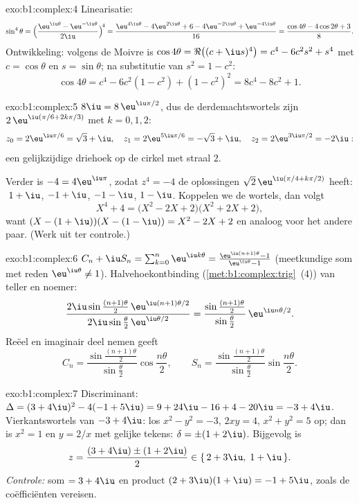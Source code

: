 \begin{solution}{exo:b1:complex:4}
Linearisatie:
\[
\sin^4\theta
= \Bigl(\frac{\eu^{\iu\theta} - \eu^{-\iu\theta}}{2\iu}\Bigr)^{\!4}
= \frac{\eu^{4\iu\theta} - 4\eu^{2\iu\theta} + 6 - 4\eu^{-2\iu\theta}
+ \eu^{-4\iu\theta}}{16}
= \frac{\cos 4\theta - 4\cos 2\theta + 3}{8}.
\]
Ontwikkeling: volgens de Moivre is $\cos 4\theta = \Re\bigl((c + \iu
s)^4\bigr) = c^4 - 6c^2 s^2 + s^4$ met $c = \cos\theta$ en $s =
\sin\theta$; na substitutie van $s^2 = 1 - c^2$:
\[
\cos 4\theta = c^4 - 6c^2(1 - c^2) + (1 - c^2)^2
= 8c^4 - 8c^2 + 1 .
\]
\end{solution}

\begin{solution}{exo:b1:complex:5}
$8\iu = 8\,\eu^{\iu\pi/2}$, dus de derdemachtswortels zijn
$2\,\eu^{\iu(\pi/6 + 2k\pi/3)}$ met $k = 0, 1, 2$:
\[
z_0 = 2\eu^{\iu\pi/6} = \sqrt 3 + \iu,\quad
z_1 = 2\eu^{5\iu\pi/6} = -\sqrt 3 + \iu,\quad
z_2 = 2\eu^{3\iu\pi/2} = -2\iu :
\]
een gelijkzijdige driehoek op de cirkel met straal $2$.

Verder is $-4 = 4\eu^{\iu\pi}$, zodat $z^4 = -4$ de oplossingen $\sqrt
2\, \eu^{\iu(\pi/4 + k\pi/2)}$ heeft: $\;1 + \iu$, $-1 + \iu$, $-1 -
\iu$, $1 - \iu$. Koppelen we de  wortels, dan volgt
\[
X^4 + 4 = \bigl(X^2 - 2X + 2\bigr)\bigl(X^2 + 2X + 2\bigr),
\]
want $(X - (1+\iu))(X - (1-\iu)) = X^2 - 2X + 2$ en analoog voor het
andere paar. (Werk uit ter controle.)
\end{solution}

\begin{solution}{exo:b1:complex:6}
$C_n + \iu S_n = \sum_{k=0}^{n} \eu^{\iu k\theta} =
\frac{\eu^{\iu(n+1)\theta} - 1}{\eu^{\iu\theta} - 1}$ (meetkundige som
met reden $\eu^{\iu\theta} \neq 1$). Halvehoekontbinding
(\cref{met:b1:complex:trig}~(4)) van teller en noemer:
\[
\frac{2\iu\sin\frac{(n+1)\theta}{2}\, \eu^{\iu(n+1)\theta/2}}
{2\iu\sin\frac{\theta}{2}\, \eu^{\iu\theta/2}}
= \frac{\sin\frac{(n+1)\theta}{2}}{\sin\frac{\theta}{2}}\,
\eu^{\iu n\theta/2}.
\]
Reëel en imaginair deel nemen geeft
\[
C_n = \frac{\sin\frac{(n+1)\theta}{2}}{\sin\frac{\theta}{2}}
\cos\frac{n\theta}{2},
\qquad
S_n = \frac{\sin\frac{(n+1)\theta}{2}}{\sin\frac{\theta}{2}}
\sin\frac{n\theta}{2}.
\]
\end{solution}

\begin{solution}{exo:b1:complex:7}
Discriminant: $\Delta = (3 + 4\iu)^2 - 4(-1 + 5\iu) = 9 + 24\iu - 16 + 4
- 20\iu = -3 + 4\iu$. Vierkantswortels van $-3 + 4\iu$: los $x^2 - y^2 =
-3$, $2xy = 4$, $x^2 + y^2 = 5$ op; dan is $x^2 = 1$ en $y = 2/x$ met
gelijke tekens: $\delta = \pm(1 + 2\iu)$. Bijgevolg is
\[
z = \frac{(3 + 4\iu) \pm (1 + 2\iu)}{2}
\in \{\, 2 + 3\iu,\; 1 + \iu \,\}.
\]
\emph{Controle:} som $= 3 + 4\iu$ en product $(2+3\iu)(1+\iu) = -1 +
5\iu$, zoals de coëfficiënten vereisen.
\end{solution}

